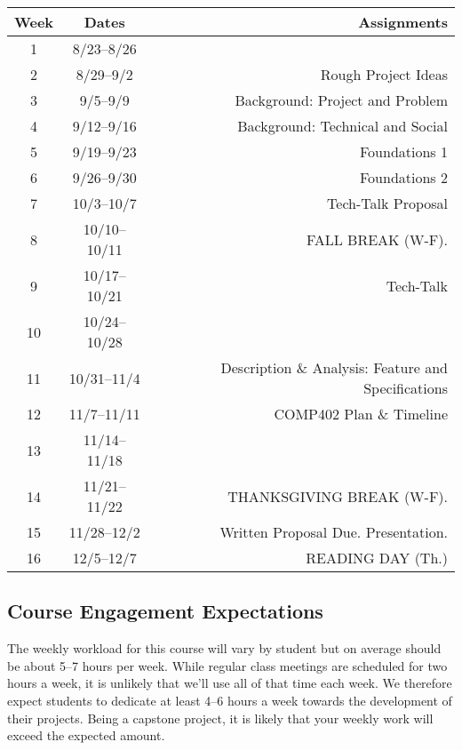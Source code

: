 \documentclass[10pt]{article}
\begin{document}
\begin{center}
\begin{tabular}{ccr}
\toprule
Week & Dates & Assignments \\
\toprule
1 & 8/23--8/26 &  \\
2 & 8/29--9/2 &   Rough Project Ideas \\
3 & 9/5--9/9 &   Background: Project and Problem  \\
4 & 9/12--9/16 & Background: Technical and Social  \\
5 & 9/19--9/23 & Foundations 1  \\
6 & 9/26--9/30  &  Foundations 2 \\
7 & 10/3--10/7 &  Tech-Talk Proposal \\
8 & 10/10--10/11 & FALL BREAK (W-F). \\
9 & 10/17--10/21 &  Tech-Talk \\
10 & 10/24--10/28 &  \\
11 & 10/31--11/4 &  Description \& Analysis: Feature and Specifications \\
12 & 11/7--11/11 & COMP402 Plan \& Timeline \\
13 & 11/14--11/18 & \\
14 & 11/21--11/22 &  THANKSGIVING BREAK (W-F).  \\
15 & 11/28--12/2 &   Written Proposal Due. Presentation. \\
16 & 12/5--12/7 &  READING DAY (Th.) \\
\bottomrule
\end{tabular}
\end{center}

\subsection{Course Engagement Expectations}

The weekly workload for this course will vary by student but on average should be about 5--7 hours per week.  While regular class meetings are scheduled for two hours a week, it is unlikely that we'll use all of that time each week.  We therefore expect students to dedicate at least 4--6 hours a week towards the development of their projects.  Being a capstone project, it is likely that your weekly work will exceed the expected amount.
\end{document}
